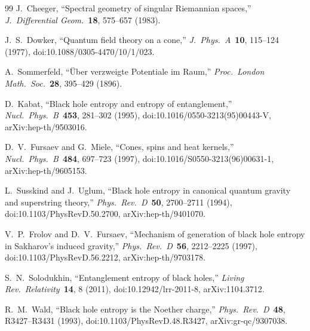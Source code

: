 \documentclass[11pt,a4paper]{article}
\theoremstyle{plain}
\theoremstyle{definition}
\renewcommand{\_}{\textunderscore\allowbreak}
\begin{document}
\begin{thebibliography}{99}
J.~Cheeger, ``Spectral geometry of singular Riemannian spaces,''
\textit{J.~Differential Geom.}\ \textbf{18}, 575--657 (1983).

J.~S.~Dowker, ``Quantum field theory on a cone,''
\textit{J.~Phys.~A}\ \textbf{10}, 115--124 (1977),
doi:10.1088/0305-4470/10/1/023.

A.~Sommerfeld, ``\"Uber verzweigte Potentiale im Raum,''
\textit{Proc.~London Math.~Soc.}\ \textbf{28}, 395--429 (1896).

D.~Kabat, ``Black hole entropy and entropy of entanglement,''
\textit{Nucl.~Phys.~B}\ \textbf{453}, 281--302 (1995),
doi:10.1016/0550-3213(95)00443-V, arXiv:hep-th/9503016.

D.~V.~Fursaev and G.~Miele, ``Cones, spins and heat kernels,''
\textit{Nucl.~Phys.~B}\ \textbf{484}, 697--723 (1997),
doi:10.1016/S0550-3213(96)00631-1, arXiv:hep-th/9605153.

L.~Susskind and J.~Uglum, ``Black hole entropy in canonical quantum
gravity and superstring theory,'' \textit{Phys.~Rev.~D}\ \textbf{50},
2700--2711 (1994), doi:10.1103/PhysRevD.50.2700, arXiv:hep-th/9401070.

V.~P.~Frolov and D.~V.~Fursaev, ``Mechanism of generation of black hole
entropy in Sakharov's induced gravity,'' \textit{Phys.~Rev.~D}\
\textbf{56}, 2212--2225 (1997), doi:10.1103/PhysRevD.56.2212,
arXiv:hep-th/9703178.

S.~N.~Solodukhin, ``Entanglement entropy of black holes,''
\textit{Living Rev.~Relativity}\ \textbf{14}, 8 (2011),
doi:10.12942/lrr-2011-8, arXiv:1104.3712.

R.~M.~Wald, ``Black hole entropy is the Noether charge,''
\textit{Phys.~Rev.~D}\ \textbf{48}, R3427--R3431 (1993),
doi:10.1103/PhysRevD.48.R3427, arXiv:gr-qc/9307038.

\end{thebibliography}
\end{document}

